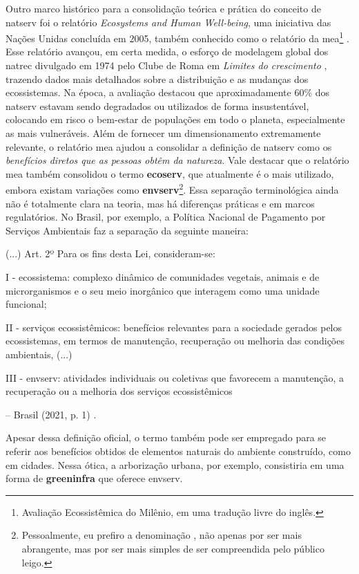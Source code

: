 \documentclass[./main.tex]{subfiles}
\begin{document}
\par Outro marco histórico para a consolidação teórica e prática do conceito de \gls{natserv} foi o relatório \textit{Ecosystems and Human Well-being}, uma iniciativa das Nações Unidas concluída em 2005, também conhecido como o relatório da \acrfull{mea}\footnote{Avaliação Ecossistêmica do Milênio, em uma tradução livre do inglês.} \cite{MEA2005a}. Esse relatório avançou, em certa medida, o esforço de modelagem global dos \gls{natrec} divulgado em 1974 pelo Clube de Roma em \textit{Limites do crescimento} \cite{meadows1974}, trazendo dados mais detalhados sobre a distribuição e as mudanças dos ecossistemas. Na época, a avaliação destacou que aproximadamente 60\% dos \gls{natserv} estavam sendo degradados ou utilizados de forma insustentável, colocando em risco o bem-estar de populações em todo o planeta, especialmente as mais vulneráveis. Além de fornecer um dimensionamento extremamente relevante, o relatório \acrshort{mea} ajudou a consolidar a definição de \gls{natserv} como os \textit{benefícios diretos que as pessoas obtêm da natureza}. Vale destacar que o relatório \acrshort{mea} também consolidou o termo \textbf{\gls{ecoserv}}, que atualmente é o mais utilizado, embora existam variações como \textbf{\gls{envserv}}\footnote{Pessoalmente, eu prefiro a denominação , não apenas por ser mais abrangente, mas por ser mais simples de ser compreendida pelo público leigo.}. Essa separação terminológica ainda não é totalmente clara na \gls{teoria}, mas há diferenças práticas e em marcos regulatórios. No Brasil, por exemplo, a Política Nacional de Pagamento por Serviços Ambientais faz a separação da seguinte maneira:

\begin{adjustwidth}{100pt}{0pt}
\medskip
\small 
(...)
Art. 2º Para os fins desta Lei, consideram-se:

I - ecossistema: complexo dinâmico de comunidades vegetais, animais e de microrganismos e o seu meio inorgânico que interagem como uma unidade funcional; 

II - serviços ecossistêmicos: benefícios relevantes para a sociedade gerados pelos ecossistemas, em termos de manutenção, recuperação ou melhoria das condições ambientais, (...)

III - \gls{envserv}: atividades individuais ou coletivas que favorecem a manutenção, a recuperação ou a melhoria dos serviços ecossistêmicos

-- Brasil (2021, p. 1) \cite{brasil2021}.
\medskip
\end{adjustwidth}
\noindent Apesar dessa definição oficial, o termo  também pode ser empregado para se referir aos benefícios obtidos de elementos naturais do ambiente construído, como em cidades. Nessa ótica, a arborização urbana, por exemplo, consistiria em uma forma de \textbf{\gls{greeninfra}} que oferece \gls{envserv}.
\end{document}
